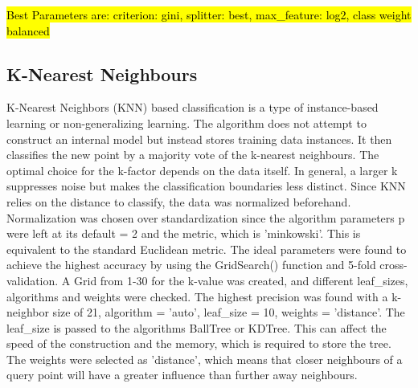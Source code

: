 \documentclass[11pt]{article}
\begin{document}
	\hl{Best Parameters are:  criterion: gini, splitter: best, max\_feature: log2, class weight balanced}

	
	\subsection{K-Nearest Neighbours}
	K-Nearest Neighbors (KNN) based classification is a type of instance-based learning or non-generalizing learning. The algorithm does not attempt to construct an internal model but instead stores training data instances. It then classifies the new point by a majority vote of the k-nearest neighbours. The optimal choice for the k-factor depends on the data itself. In general, a larger k suppresses noise but makes the classification boundaries less distinct. Since KNN relies on the distance to classify, the data was normalized beforehand. Normalization was chosen over standardization since the algorithm parameters p were left at its default = 2 and the metric, which is 'minkowski'. This is equivalent to the standard Euclidean metric. The ideal parameters were found to achieve the highest accuracy by using the GridSearch() function and 5-fold cross-validation. A Grid from 1-30 for the k-value was created, and different leaf\_sizes, algorithms and weights were checked. The highest precision was found with a k-neighbor size of 21, algorithm = 'auto', leaf\_size = 10, weights = 'distance'. The leaf\_size is passed to the algorithms BallTree or KDTree. This can affect the speed of the construction and the memory, which is required to store the tree. The weights were selected as 'distance', which means that closer neighbours of a query point will have a greater influence than further away neighbours.
		
\end{document}

